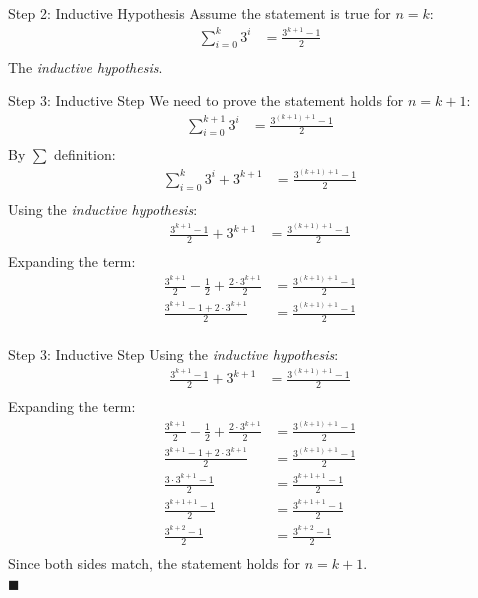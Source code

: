 \documentclass{beamer}
\renewcommand{\qed}{\\ \hfill $\blacksquare$}
\begin{document}
\begin{frame}{Step 2: Inductive Hypothesis}
    Assume the statement is true for $n = k$:
    \begin{align*}
        \sum_{i = 0}^k 3^i &= \frac{3^{k + 1} - 1}{2} \\
    \end{align*}
    The \textit{inductive hypothesis}.
\end{frame}

\begin{frame}{Step 3: Inductive Step}
    \footnotesize
    We need to prove the statement holds for $n = k + 1$:
    \begin{align*}
        \sum_{i = 0}^{k + 1} 3^i &= \frac{3^{(k + 1) + 1} - 1}{2} \\
    \end{align*}
    \pause
    By $\sum$ definition:
    \begin{align*}
        \sum_{i = 0}^k 3^i + 3^{k + 1} &= \frac{3^{(k + 1) + 1} - 1}{2} \\
    \end{align*}
    \pause
    Using the \textit{inductive hypothesis}:
    \begin{align*}
        \frac{3^{k + 1} - 1}{2} + 3^{k + 1} &= \frac{3^{(k + 1) + 1} - 1}{2} \\
    \end{align*}
    \pause
    Expanding the term:
    \begin{align*}
        \frac{3^{k + 1}}{2} - \frac{1}{2} + \frac{2 \cdot 3^{k + 1}}{2} &= \frac{3^{(k + 1) + 1} - 1}{2} \\
        \frac{3^{k + 1} - 1 + 2 \cdot 3^{k + 1}}{2} &= \frac{3^{(k + 1) + 1} - 1}{2} \\
    \end{align*}
\end{frame}

\begin{frame}{Step 3: Inductive Step}
    \footnotesize
    Using the \textit{inductive hypothesis}:
    \begin{align*}
        \frac{3^{k + 1} - 1}{2} + 3^{k + 1} &= \frac{3^{(k + 1) + 1} - 1}{2} \\
    \end{align*}
    Expanding the term:
    \begin{align*}
        \frac{3^{k + 1}}{2} - \frac{1}{2} + \frac{2 \cdot 3^{k + 1}}{2} &= \frac{3^{(k + 1) + 1} - 1}{2} \\
        \frac{3^{k + 1} - 1 + 2 \cdot 3^{k + 1}}{2} &= \frac{3^{(k + 1) + 1} - 1}{2} \\
        \frac{3 \cdot 3^{k + 1} - 1}{2} &= \frac{3^{k + 1 + 1} - 1}{2} \\
        \frac{3^{k + 1 + 1} - 1}{2} &= \frac{3^{k + 1 + 1} - 1}{2} \\
        \frac{3^{k + 2} - 1}{2} &= \frac{3^{k + 2} - 1}{2} \\
    \end{align*}
    \pause
    Since both sides match, the statement holds for $n = k + 1$.
    \qed
\end{frame}
\end{document}
